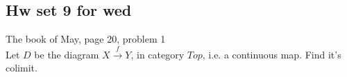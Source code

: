 \documentclass{amsart}
\numberwithin{equation}{section}
\theoremstyle{definition}
\theoremstyle{remark}
\begin{document}
\subsection*{Hw set 9 for wed}
The book of May, page 20, problem 1 \\ 
Let $D$ be the diagram $X \xrightarrow{f} Y$, in category
$Top$, i.e. a continuous map. Find it's colimit.
\end{document}
